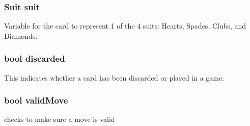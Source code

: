 \subsubsection{Suit suit}
    Variable for the card to represent 1 of the 4 suits: Hearts, Spades, Clubs, and Diamonds.
    
\subsubsection{bool discarded}
    This indicates whether a card has been discarded or played in a game.
    
\subsubsection{bool validMove}
    checks to make sure a move is valid


